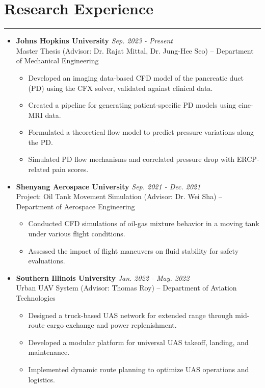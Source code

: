 \documentclass[11pt]{article}
\begin{document}
\vspace{2mm}

\section*{Research Experience}
\hrule

\begin{itemize}[leftmargin=*,itemsep=1pt]

    \item \textbf{Johns Hopkins University} \hfill \textit{Sep. 2023 - Present} \\
    Master Thesis (Advisor: Dr. Rajat Mittal, Dr. Jung-Hee Seo) – Department of Mechanical Engineering
    \begin{itemize}[leftmargin=*,itemsep=1pt]
        \item Developed an imaging data-based CFD model of the pancreatic duct (PD) using the CFX solver, validated against clinical data.
        \item Created a pipeline for generating patient-specific PD models using cine-MRI data.
        \item Formulated a theoretical flow model to predict pressure variations along the PD.
        \item Simulated PD flow mechanisms and correlated pressure drop with ERCP-related pain scores.
    \end{itemize}

    \item \textbf{Shenyang Aerospace University} \hfill \textit{Sep. 2021 - Dec. 2021} \\
    Project: Oil Tank Movement Simulation (Advisor: Dr. Wei Sha) – Department of Aerospace Engineering
    \begin{itemize}[leftmargin=*,itemsep=1pt]
        \item Conducted CFD simulations of oil-gas mixture behavior in a moving tank under various flight conditions.
        \item Assessed the impact of flight maneuvers on fluid stability for safety evaluations.
    \end{itemize}

    \item \textbf{Southern Illinois University} \hfill \textit{Jan. 2022 - May. 2022} \\
    Urban UAV System (Advisor: Thomas Roy) – Department of Aviation Technologies
    \begin{itemize}[leftmargin=*,itemsep=1pt]
        \item Designed a truck-based UAS network for extended range through mid-route cargo exchange and power replenishment.
        \item Developed a modular platform for universal UAS takeoff, landing, and maintenance.
        \item Implemented dynamic route planning to optimize UAS operations and logistics.
    \end{itemize}

\end{itemize}
\end{document}
